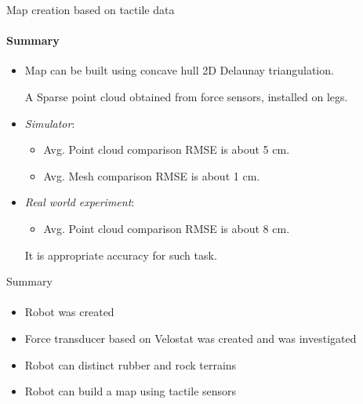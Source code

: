 \documentclass[aspectratio=169]{beamer}
\newcommand{\fbckg}[1]{\usebackgroundtemplate{\texttt{[image: \#1]}}}%
\begin{document}
\begin{frame}[t]{Map creation based on tactile data}
    \framesubtitle{Summary}
    \Large
    \begin{itemize}
        \item Map can be built using concave hull 2D Delaunay triangulation.

              A Sparse point cloud obtained from force sensors, installed on legs.
        \item \textit{Simulator}: \begin{itemize}
            \large
                  \item Avg. Point cloud comparison RMSE is about 5 cm.
                  \item Avg. Mesh comparison RMSE is about 1 cm.
              \end{itemize}
        \item \textit{Real world experiment}: \begin{itemize}
            \large
                  \item Avg. Point cloud comparison RMSE is about 8 cm.
              \end{itemize}
              It is appropriate accuracy for such task.
    \end{itemize}
\end{frame}

\begin{frame}[t]{Summary}
    \framesubtitle{}
    \Large
    \begin{itemize}
        \item Robot was created
        \item Force transducer based on Velostat was created and was investigated
        \item Robot can distinct rubber and rock terrains
        \item Robot can build a map using tactile sensors
    \end{itemize}
\end{frame}

\end{document}
